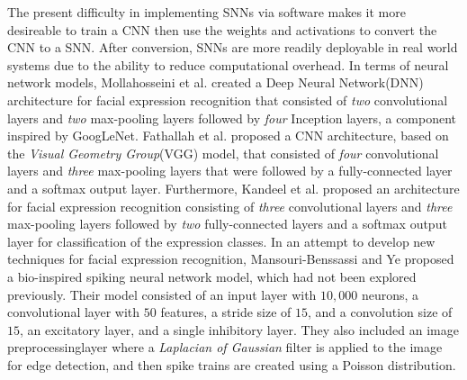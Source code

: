 \documentclass[conference]{IEEEtran}
\begin{document}
The present difficulty in implementing SNNs via software makes it more desireable to train a
CNN then use the weights and activations to convert the CNN to a SNN. After conversion, SNNs are
more readily deployable in real world systems due to the ability to reduce computational overhead.
In terms of neural network models, Mollahosseini et al. \cite{mollahosseini} created a Deep Neural
Network(DNN) architecture for facial expression recognition that consisted of \textit{two} convolutional
layers and \textit{two} max-pooling layers followed by \textit{four} Inception\cite{inception} layers,
a component inspired by GoogLeNet. Fathallah et al. \cite{fathallah} proposed a CNN architecture, based
on the \textit{Visual Geometry Group}(VGG) model\cite{vggnet}, that consisted of \textit{four} convolutional
layers and \textit{three} max-pooling layers that were followed by a fully-connected layer and a softmax
output layer. Furthermore, Kandeel et al. \cite{kandeel} proposed an architecture for facial expression
recognition consisting of \textit{three} convolutional layers and \textit{three} max-pooling layers
followed by \textit{two} fully-connected layers and a softmax output layer for classification of the
expression classes. In an attempt to develop new techniques for facial expression recognition, Mansouri-Benssassi
and Ye \cite{mansouri} proposed a bio-inspired spiking neural network model, which had not been explored
previously. Their model consisted of an input layer with $10,000$ neurons, a convolutional layer with
$50$ features, a stride size of $15$, and a convolution size of $15$, an excitatory layer, and a single inhibitory
layer. They also included an image preprocessinglayer where a \textit{Laplacian of Gaussian} filter is applied to
the image for edge detection, and then spike trains are created using a Poisson distribution.
\end{document}
